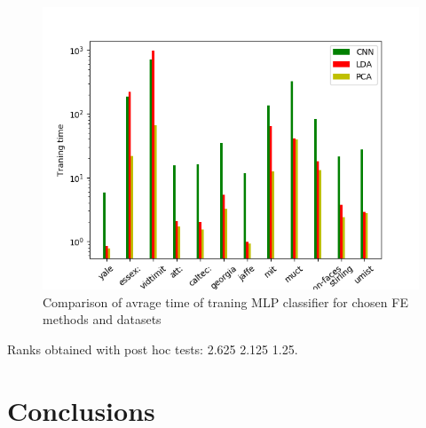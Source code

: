 \documentclass[a4paper, 10 pt, conference]{ieeeconf}
\begin{document}
\begin{figure}[!h]
    \centering
    \includegraphics[scale=0.875]{images/NN_fit_time_comparison.png}
    \caption{Comparison of avrage time of traning MLP classifier for chosen FE methods and datasets}
    \label{fig:svm_fit_time_comparision}
\end{figure}

Ranks obtained with post hoc tests: 2.625 2.125 1.25.


\section{Conclusions}




\end{document}
